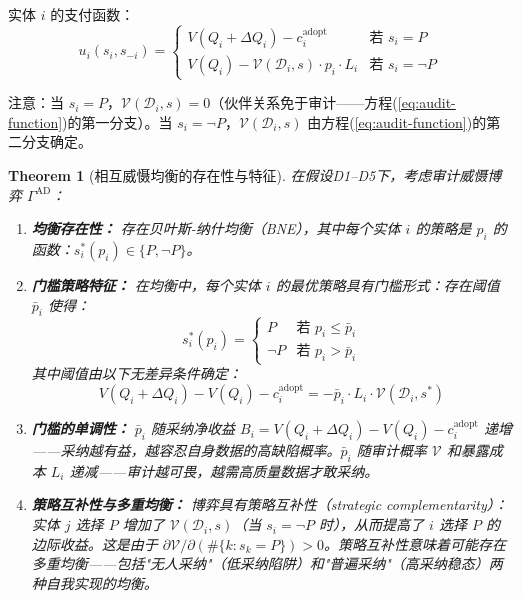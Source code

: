 \documentclass[12pt,a4paper]{ctexart}
\newtheorem{theorem}{Theorem}[section]
\theoremstyle{definition}
\theoremstyle{remark}
\begin{document}
实体 $i$ 的支付函数：
\begin{equation}
u_i(s_i, s_{-i}) =
\begin{cases}
V(Q_i + \Delta Q_i) - c_i^{\text{adopt}} & \text{若 } s_i = P \\
V(Q_i) - \mathcal{V}(\mathcal{D}_i, s) \cdot p_i \cdot L_i & \text{若 } s_i = \neg P
\end{cases}
\label{eq:ad-payoffs}
\end{equation}

注意：当 $s_i = P$，$\mathcal{V}(\mathcal{D}_i, s) = 0$（伙伴关系免于审计——方程(\ref{eq:audit-function})的第一分支）。当 $s_i = \neg P$，$\mathcal{V}(\mathcal{D}_i, s)$ 由方程(\ref{eq:audit-function})的第二分支确定。

\begin{theorem}[相互威慑均衡的存在性与特征]
\label{thm:mutual-deterrence}
在假设D1--D5下，考虑审计威慑博弈 $\Gamma^{\text{AD}}$：

\begin{enumerate}[label=(\roman*), itemsep=6pt]
\item \textbf{均衡存在性：} 存在贝叶斯-纳什均衡（BNE），其中每个实体 $i$ 的策略是 $p_i$ 的函数：$s_i^*(p_i) \in \{P, \neg P\}$。

\item \textbf{门槛策略特征：} 在均衡中，每个实体 $i$ 的最优策略具有门槛形式：存在阈值 $\bar{p}_i$ 使得：
\begin{equation}
s_i^*(p_i) =
\begin{cases}
P & \text{若 } p_i \leq \bar{p}_i \\
\neg P & \text{若 } p_i > \bar{p}_i
\end{cases}
\label{eq:threshold-strategy}
\end{equation}
其中阈值由以下无差异条件确定：
\begin{equation}
V(Q_i + \Delta Q_i) - V(Q_i) - c_i^{\text{adopt}} = -\bar{p}_i \cdot L_i \cdot \mathcal{V}(\mathcal{D}_i, s^*)
\label{eq:threshold-condition}
\end{equation}

\item \textbf{门槛的单调性：} $\bar{p}_i$ 随采纳净收益 $B_i = V(Q_i + \Delta Q_i) - V(Q_i) - c_i^{\text{adopt}}$ 递增——采纳越有益，越容忍自身数据的高缺陷概率。$\bar{p}_i$ 随审计概率 $\mathcal{V}$ 和暴露成本 $L_i$ 递减——审计越可畏，越需高质量数据才敢采纳。

\item \textbf{策略互补性与多重均衡：} 博弈具有策略互补性（strategic complementarity）：实体 $j$ 选择 $P$ 增加了 $\mathcal{V}(\mathcal{D}_i, s)$（当 $s_i = \neg P$ 时），从而提高了 $i$ 选择 $P$ 的边际收益。这是由于 $\partial \mathcal{V} / \partial (\#\{k: s_k = P\}) > 0$。策略互补性意味着可能存在多重均衡——包括"无人采纳"（低采纳陷阱）和"普遍采纳"（高采纳稳态）两种自我实现的均衡。


\end{enumerate}
\end{theorem}
\end{document}
